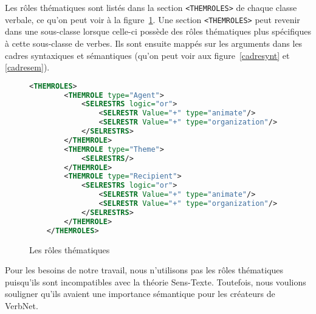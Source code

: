 Les rôles thématiques sont listés dans la section \lstinline|<THEMROLES>| de chaque classe verbale, ce qu'on peut voir à la figure~\ref{rolestheta}. Une section \lstinline|<THEMROLES>| peut revenir dans une sous-classe lorsque celle-ci possède des rôles thématiques plus spécifiques à cette sous-classe de verbes. Ils sont ensuite mappés sur les arguments dans les cadres syntaxiques et sémantiques (qu'on peut voir aux figure~\ref{cadresynt} et \ref{cadresem}).

\begin{figure}[htb]
  \caption{Les rôles thématiques}
	\label{rolestheta}
\begin{lstlisting}[language=XML] % Majuscule aux captions
    <THEMROLES>
        <THEMROLE type="Agent">
            <SELRESTRS logic="or">
                <SELRESTR Value="+" type="animate"/>
                <SELRESTR Value="+" type="organization"/>
            </SELRESTRS>
        </THEMROLE>
        <THEMROLE type="Theme">
            <SELRESTRS/>
        </THEMROLE>
        <THEMROLE type="Recipient">
            <SELRESTRS logic="or">
                <SELRESTR Value="+" type="animate"/>
                <SELRESTR Value="+" type="organization"/>
            </SELRESTRS>
        </THEMROLE>
    </THEMROLES>
\end{lstlisting}
\end{figure}

Pour les besoins de notre travail, nous n'utilisons pas les rôles thématiques puisqu'ils sont incompatibles avec la théorie Sens-Texte. Toutefois, nous voulions souligner qu'ils avaient une importance sémantique pour les créateurs de VerbNet.


